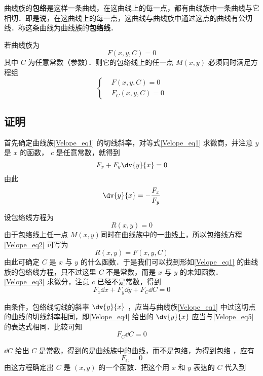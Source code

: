 
曲线族的\textbf{包络}是这样一条曲线，在这曲线上的每一点，都有曲线族中一条曲线与它相切．即是说，在这曲线上的每一点，这曲线与曲线族中通过这点的曲线有公切线．称这条曲线为曲线族的\textbf{包络线}．

若曲线族为 
\begin{equation}\label{Velope_eq1}
F(x,y,C)=0
\end{equation}
其中 $C$ 为任意常数（参数）．则它的包络线上的任一点 $M(x,y)$ 必须同时满足方程组
\begin{equation}
\left\{\begin{aligned}
&F(x,y,C)=0\\
&F_C(x,y,C)=0
\end{aligned}\right.
\end{equation}
\subsection{证明}
首先确定曲线族\autoref{Velope_eq1} 的切线斜率，对等式\autoref{Velope_eq1} 求微商，并注意 $y$ 是 $x$ 的函数， $c$ 是任意常数，就得到
\begin{equation}
F_x+F_y\dv{y}{x}=0
\end{equation}
由此
\begin{equation}\label{Velope_eq5}
\dv{y}{x}=-\frac{F_x}{F_y}
\end{equation}

设包络线方程为
\begin{equation}\label{Velope_eq2}
R(x,y)=0
\end{equation}
由于包络线上任一点 $M(x,y)$同时在曲线族中的一曲线上，所以包络线方程\autoref{Velope_eq2} 可写为
\begin{equation}\label{Velope_eq3}
R(x,y)=F(x,y,C)
\end{equation}
由此可确定 $C$ 是 $x$ 与 $y$ 的什么函数．于是我们可以找到形如\autoref{Velope_eq1} 的曲线族的包络线方程，只不过这里 $C$ 不是常数，而是 $x$ 与 $y$ 的未知函数．\autoref{Velope_eq3} 求微分，注意 $c$ 已经不是常数，得到
\begin{equation}\label{Velope_eq4}
F_x\dd x+F_y\dd y+F_C\dd C=0
\end{equation}

由条件，包络线切线的斜率 $\dv{y}{x}$ ，应当与曲线族\autoref{Velope_eq1} 中过这切点的曲线的切线斜率相同，即\autoref{Velope_eq4} 给出的 $\dv{y}{x}$ 应当与\autoref{Velope_eq5} 的表达式相同．比较可知
\begin{equation}
F_C\dd C=0
\end{equation}

$\dd C$ 给出 $C$ 是常数，得到的是曲线族中的曲线，而不是包络，为得到包络
，应有
\begin{equation}
F_C=0
\end{equation}
由这方程确定出 $C$ 是 $(x,y)$ 的一个函数．把这个用 $x$ 和 $y$ 表达的 $C$ 代入到